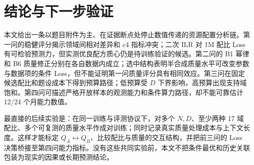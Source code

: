 \section{结论与下一步验证}
本文给出一条以题目附件为主、在证据断点处停止数值传递的资源配置分析链。第一问的稳健评分揭示领域间相对差异和 c4 指标冲突；二次 ILR 对 1M 配比 Loss 有可检验预测力，但实测优良配方质心仍是待训练验证的候选。第二问的 B1 幂律和 B6 质量修正分别在各自数据内成立；选中结构表明半合成质量水平可改变参数与数据项的条件 Loss，但不能证明第一问质量评分具有相同效应。第三问在固定候选配比和题设成本下得到预算路径；低预算受 $D$ 下界影响，高预算出现支持域饱和。第四问可描述严格开放样本的观测能力和条件算力路径，却不能可靠估计 12/24 个月能力数值。

最直接的后续实验是：在同一训练与评测协议下，对多个 $N,D$、至少两种 17 域配比、多个可复测的质量水平作成对训练；同时记录真实质量处理成本与上下文长度。这样才能标定 $Q_A\leftrightarrow Q_B$、比较配比与质量的交互结构，并把前三问的 Loss 决策桥接至第四问能力指标。没有这些共同实验前，本文不把条件最优和历史关联包装为现实的因果或长期预测结论。
